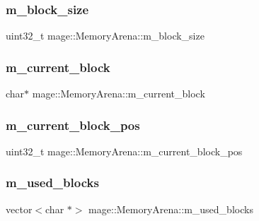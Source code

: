 \hypertarget{classmage_1_1_memory_arena_a82b0c7432237699b85a92e8a8f0c96fe}{}\label{classmage_1_1_memory_arena_a82b0c7432237699b85a92e8a8f0c96fe} 
\subsubsection{\texorpdfstring{m\+\_\+block\+\_\+size}{m\_block\_size}}
{\footnotesize\ttfamily uint32\+\_\+t mage\+::\+Memory\+Arena\+::m\+\_\+block\+\_\+size\hspace{0.3cm}{\ttfamily [private]}}

\hypertarget{classmage_1_1_memory_arena_a13eba6e2a9f8d9db2df5674aa7ce0428}{}\label{classmage_1_1_memory_arena_a13eba6e2a9f8d9db2df5674aa7ce0428} 
\subsubsection{\texorpdfstring{m\+\_\+current\+\_\+block}{m\_current\_block}}
{\footnotesize\ttfamily char$\ast$ mage\+::\+Memory\+Arena\+::m\+\_\+current\+\_\+block\hspace{0.3cm}{\ttfamily [private]}}

\hypertarget{classmage_1_1_memory_arena_a3874097398455749a85fe50a9e4984c0}{}\label{classmage_1_1_memory_arena_a3874097398455749a85fe50a9e4984c0} 
\subsubsection{\texorpdfstring{m\+\_\+current\+\_\+block\+\_\+pos}{m\_current\_block\_pos}}
{\footnotesize\ttfamily uint32\+\_\+t mage\+::\+Memory\+Arena\+::m\+\_\+current\+\_\+block\+\_\+pos\hspace{0.3cm}{\ttfamily [private]}}

\hypertarget{classmage_1_1_memory_arena_affb37aae6087014287b43d50521dd0fb}{}\label{classmage_1_1_memory_arena_affb37aae6087014287b43d50521dd0fb} 
\subsubsection{\texorpdfstring{m\+\_\+used\+\_\+blocks}{m\_used\_blocks}}
{\footnotesize\ttfamily vector$<$char $\ast$$>$ mage\+::\+Memory\+Arena\+::m\+\_\+used\+\_\+blocks\hspace{0.3cm}{\ttfamily [private]}}

